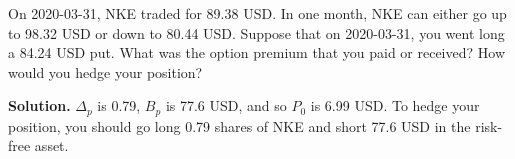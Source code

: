 \noindent On 2020-03-31, NKE traded for 89.38 USD. In one month, NKE can either go up to 98.32 USD or down to 80.44 USD. Suppose that on 2020-03-31, you went long a 84.24 USD put. What was the option premium that you paid or received? How would you hedge your position?

\vspace{9pt}

\noindent\textbf{Solution.} $\Delta_{p}$ is 0.79, $B_{p}$ is 77.6 USD, and so $P_{0}$ is 6.99 USD. To hedge your position, you should go long 0.79 shares of NKE and short 77.6 USD in the risk-free asset.